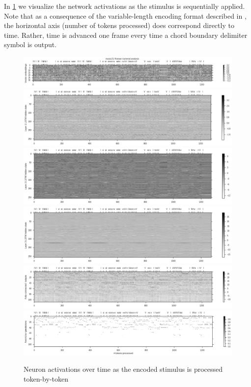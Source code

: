 \documentclass[dissertation.tex]{subfiles}
\begin{document}
In \cref{fig:model-analysis-tokens} we visualize the network activations as
the stimulus is sequentially applied. Note that as a consequence of the
variable-length encoding format described in , the horizontal axis
(number of tokens processed) does correspond directly to time. Rather, time
is advanced one frame every time a chord boundary delimiter symbol is output.

\begin{figure}[htpb]
    \centering
    \includegraphics[width=1.0\linewidth]{Figures/model-analysis-tokens-0.png}
    \includegraphics[width=1.0\linewidth]{Figures/model-analysis-tokens-1.png}
    \includegraphics[width=1.0\linewidth]{Figures/model-analysis-tokens-2.png}
    \includegraphics[width=1.0\linewidth]{Figures/model-analysis-tokens-3.png}
    \includegraphics[width=1.0\linewidth]{Figures/model-analysis-tokens-4.png}
    \includegraphics[width=1.0\linewidth]{Figures/model-analysis-tokens-5.png}
    \caption{Neuron activations over time as the encoded stimulus is processed token-by-token}
    \label{fig:model-analysis-tokens}
\end{figure}
\end{document}
